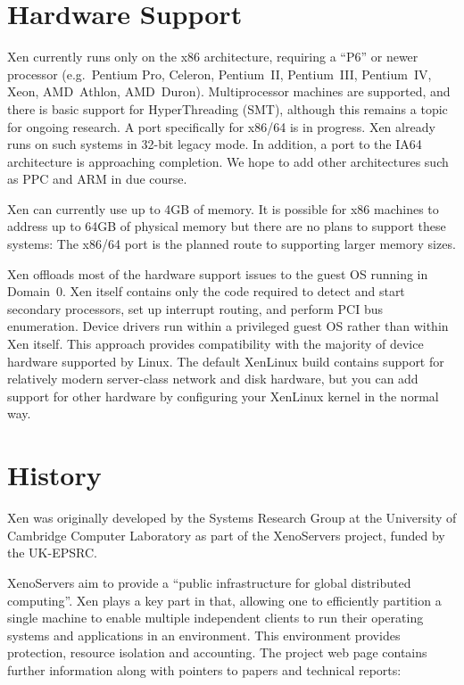 \section{Hardware Support}

Xen currently runs only on the x86 architecture, requiring a ``P6'' or
newer processor (e.g.\ Pentium Pro, Celeron, Pentium~II, Pentium~III,
Pentium~IV, Xeon, AMD~Athlon, AMD~Duron). Multiprocessor machines are
supported, and there is basic support for HyperThreading (SMT), although
this remains a topic for ongoing research. A port specifically for
x86/64 is in progress. Xen already runs on such systems in 32-bit legacy
mode. In addition, a port to the IA64 architecture is approaching
completion. We hope to add other architectures such as PPC and ARM in
due course.

Xen can currently use up to 4GB of memory. It is possible for x86
machines to address up to 64GB of physical memory but there are no plans
to support these systems: The x86/64 port is the planned route to
supporting larger memory sizes.

Xen offloads most of the hardware support issues to the guest OS running
in Domain~0. Xen itself contains only the code required to detect and
start secondary processors, set up interrupt routing, and perform PCI
bus enumeration. Device drivers run within a privileged guest OS rather
than within Xen itself. This approach provides compatibility with the
majority of device hardware supported by Linux. The default XenLinux
build contains support for relatively modern server-class network and
disk hardware, but you can add support for other hardware by configuring
your XenLinux kernel in the normal way.


\section{History}

Xen was originally developed by the Systems Research Group at the
University of Cambridge Computer Laboratory as part of the XenoServers
project, funded by the UK-EPSRC\@.

XenoServers aim to provide a ``public infrastructure for global
distributed computing''. Xen plays a key part in that, allowing one to
efficiently partition a single machine to enable multiple independent
clients to run their operating systems and applications in an
environment. This environment provides protection, resource isolation
and accounting. The project web page contains further information along
with pointers to papers and technical reports:

